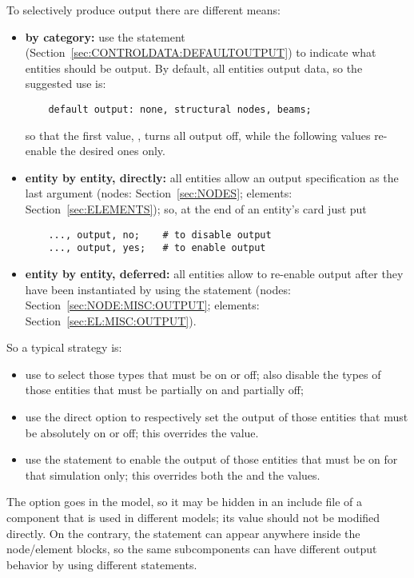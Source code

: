 To selectively produce output there are different means:
\begin{itemize}
\item \textbf{by category:} use the  statement
(Section~\ref{sec:CONTROLDATA:DEFAULTOUTPUT}) to indicate what entities
should be output.
By default, all entities output data, so the suggested use is:
\begin{verbatim}
    default output: none, structural nodes, beams;
\end{verbatim}
so that the first value, , turns all output off, while the
following values re-enable the desired ones only.

\item \textbf{entity by entity, directly:}
all entities allow an output specification as the last argument
(nodes: Section~\ref{sec:NODES}; elements: Section~\ref{sec:ELEMENTS});
so, at the end of an entity's card just put
\begin{verbatim}
    ..., output, no;    # to disable output
    ..., output, yes;   # to enable output
\end{verbatim}

\item \textbf{entity by entity, deferred:}
all entities allow to re-enable output after they have
been instantiated by using the  statement
(nodes: Section~\ref{sec:NODE:MISC:OUTPUT};
elements: Section~\ref{sec:EL:MISC:OUTPUT}).
\end{itemize}

So a typical strategy is:
\begin{itemize}
\item use  to select those types that must be on or off;
also disable the types of those entities that must be partially 
on and partially off;
\item use the direct option to respectively set the output
of those entities that must be absolutely on or off; this overrides
the  value.
\item use the  statement to enable the output of those
entities that must be on for that simulation only; this overrides
both the  and the  values.
\end{itemize}

The  option goes in the model, so it may be hidden 
in an include file of a component that is used in different models;
its value should not be modified directly.
On the contrary, the  statement can appear anywhere
inside the node/element blocks, so the same subcomponents can have
different output behavior by using different  statements.

